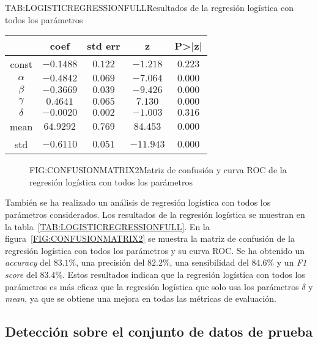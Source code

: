 \begin{table}[Resultados de la regresión logística con todos los parámetros]{TAB:LOGISTICREGRESSIONFULL}{Resultados de la regresión logística con todos los parámetros}
    \begin{tabular}{|c|c|c|c|c|}
        \hline
        & coef & std err & z & P>|z| \\
        \hline
        const & $-0.1488$ & $0.122$ & $-1.218$ & $0.223$ \\
        $\alpha$ & $-0.4842$ & $0.069$ & $-7.064$ & $0.000$ \\
        $\beta$ & $-0.3669$ & $0.039$ & $-9.426$ & $0.000$ \\
        $\gamma$ & $0.4641$ & $0.065$ & $7.130$ & $0.000$ \\
        $\delta$ & $-0.0020$ & $0.002$ & $-1.003$ & $0.316$ \\
        mean & $64.9292$ & $0.769$ & $84.453$ & $0.000$ \\
        std & $-0.6110$ & $0.051$ & $-11.943$ & $0.000$ \\
        \hline
    \end{tabular}
\end{table}

\begin{figure}[Matriz de confusión y curva ROC de la regresión logística con todos los parámetros]{FIG:CONFUSIONMATRIX2}{Matriz de confusión y curva ROC de la regresión logística con todos los parámetros}
     \quad
\end{figure}

También se ha realizado un análisis de regresión logística con todos los parámetros considerados. Los resultados de la regresión logística se muestran en la tabla~\ref{TAB:LOGISTICREGRESSIONFULL}.
En la figura~\ref{FIG:CONFUSIONMATRIX2} se muestra la matriz de confusión de la regresión logística con todos los parámetros y su curva \ac{ROC}. Se ha obtenido un \textit{accuracy} del $83.1\%$, una precisión del $82.2\%$, una sensibilidad del $84.6\%$ y un \textit{F1 score} del $83.4\%$. Estos resultados indican que la regresión logística con todos los parámetros es más eficaz que la regresión logística que solo usa los parámetros $\delta$ y \textit{mean}, ya que se obtiene una mejora en todas las métricas de evaluación.

\subsection{Detección sobre el conjunto de datos de prueba}\label{SUBSEC:DETECCIONDATASET}

